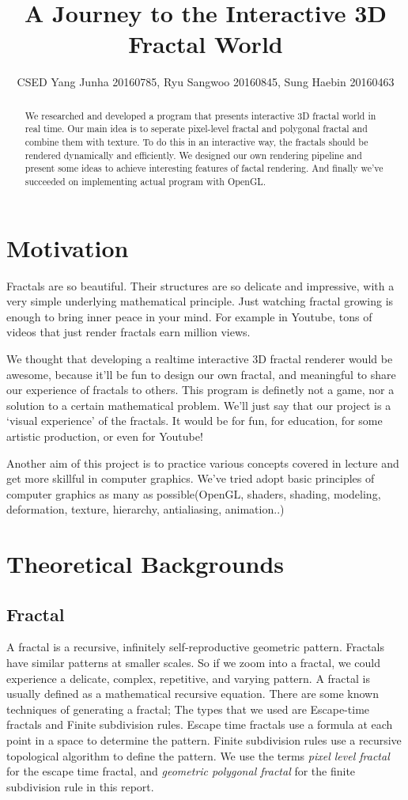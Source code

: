 \documentclass[a4paper]{article}
\title{A Journey to the Interactive 3D Fractal World}
\author{CSED Yang Junha 20160785, Ryu Sangwoo 20160845, Sung Haebin 20160463}
\begin{document}
\maketitle
\begin{abstract}
We researched and developed a program that presents interactive 3D fractal world in real time.
Our main idea is to seperate pixel-level fractal and polygonal fractal and combine them with texture.
To do this in an interactive way, the fractals should be rendered dynamically and efficiently.
We designed our own rendering pipeline and present some ideas to achieve interesting features of factal rendering.
And finally we've succeeded on implementing actual program with OpenGL.
\end{abstract}
\section{Motivation}
Fractals are so beautiful.
Their structures are so delicate and impressive, with a very simple underlying mathematical principle.
Just watching fractal growing is enough to bring inner peace in your mind.
For example in Youtube, tons of videos that just render fractals earn million views.

We thought that developing a realtime interactive 3D fractal renderer would be awesome,
because it'll be fun to design our own fractal, and meaningful to share our experience of fractals to others.
This program is definetly not a game, nor a solution to a certain mathematical problem.
We'll just say that our project is a `visual experience' of the fractals.
It would be for fun, for education, for some artistic production, or even for Youtube!

Another aim of this project is to practice various concepts covered in lecture and get more skillful in computer graphics.
We've tried adopt basic principles of computer graphics as many as possible(OpenGL, shaders, shading, modeling, deformation, texture, hierarchy, antialiasing, animation..)

\section{Theoretical Backgrounds}
\subsection{Fractal}
A fractal is a recursive, infinitely self-reproductive geometric pattern.
Fractals have similar patterns at smaller scales.
So if we zoom into a fractal, we could experience a delicate, complex, repetitive, and varying pattern.
A fractal is usually defined as a mathematical recursive equation.
There are some known techniques of generating a fractal;
The types that we used are Escape-time fractals and Finite subdivision rules.
Escape time fractals use a formula at each point in a space to determine the pattern.
Finite subdivision rules use a recursive topological algorithm to define the pattern.
We use the terms \textit{pixel level fractal} for the escape time fractal, and \textit{geometric polygonal fractal} for the finite subdivision rule in this report.
\end{document}
